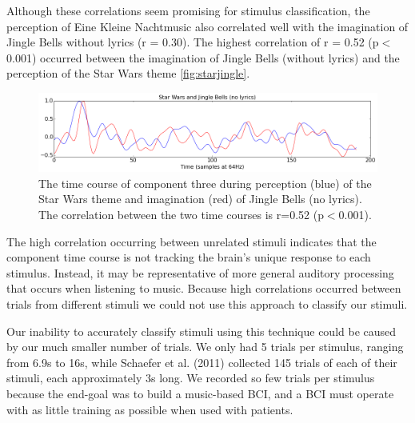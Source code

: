Although these correlations seem promising for stimulus classification, the perception of Eine Kleine Nachtmusic also correlated well with the imagination of Jingle Bells without lyrics (r = 0.30). 
The highest correlation of r = 0.52 (p$<$0.001) occurred between the imagination of Jingle Bells (without lyrics) and the perception of the Star Wars theme \autoref{fig:starjingle}.
\begin{figure}[htbp]
  \centerline{\includegraphics[scale=0.4]{Figures/TimeCourse-StarJingle}}
  \caption{The time course of component three during perception (blue) of the Star Wars theme and imagination (red) of Jingle Bells (no lyrics). The correlation between the two time courses is r=0.52 (p$<$0.001).}
  \label{fig:starjingle}
\end{figure}
The high correlation occurring between unrelated stimuli indicates that the component time course is not tracking the brain's unique response to each stimulus. 
Instead, it may be representative of more general auditory processing that occurs when listening to music. 
Because high correlations occurred between trials from different stimuli we could not use this approach to classify our stimuli.

Our inability to accurately classify stimuli using this technique could be caused by our much smaller number of trials.
We only had 5 trials per stimulus, ranging from 6.9s to 16s, while Schaefer et al. (2011) collected 145 trials of each of their stimuli, each approximately 3s long.
We recorded so few trials per stimulus because the end-goal was to build a music-based BCI, and a BCI must operate with as little training as possible when used with patients. 